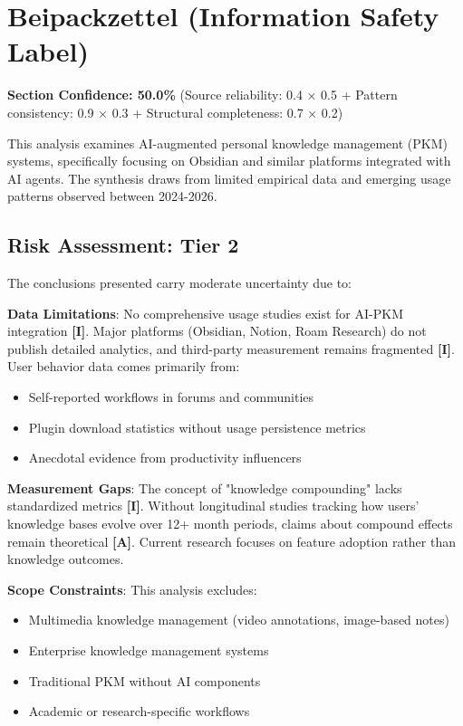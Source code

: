 \documentclass[a4paper,11pt]{article}
\newcommand{\ilabel}{\textbf{\textcolor{icolor}{[I]}}}
\newcommand{\alabel}{\textbf{\textcolor{acolor}{[A]}}}
\begin{document}
\section{Beipackzettel (Information Safety Label)}

\textbf{Section Confidence: 50.0\%} (Source reliability: 0.4 × 0.5 + Pattern consistency: 0.9 × 0.3 + Structural completeness: 0.7 × 0.2)


This analysis examines AI-augmented personal knowledge management (PKM) systems, specifically focusing on Obsidian and similar platforms integrated with AI agents. The synthesis draws from limited empirical data and emerging usage patterns observed between 2024-2026.


\subsection{Risk Assessment: Tier 2}

The conclusions presented carry moderate uncertainty due to:


\textbf{Data Limitations}: No comprehensive usage studies exist for AI-PKM integration \ilabel{}. Major platforms (Obsidian, Notion, Roam Research) do not publish detailed analytics, and third-party measurement remains fragmented \ilabel{}. User behavior data comes primarily from:

\begin{itemize}
  \item Self-reported workflows in forums and communities
  \item Plugin download statistics without usage persistence metrics
  \item Anecdotal evidence from productivity influencers
\end{itemize}

\textbf{Measurement Gaps}: The concept of "knowledge compounding" lacks standardized metrics \ilabel{}. Without longitudinal studies tracking how users' knowledge bases evolve over 12+ month periods, claims about compound effects remain theoretical \alabel{}. Current research focuses on feature adoption rather than knowledge outcomes.


\textbf{Scope Constraints}: This analysis excludes:

\begin{itemize}
  \item Multimedia knowledge management (video annotations, image-based notes)
  \item Enterprise knowledge management systems
  \item Traditional PKM without AI components
  \item Academic or research-specific workflows
\end{itemize}
\end{document}

